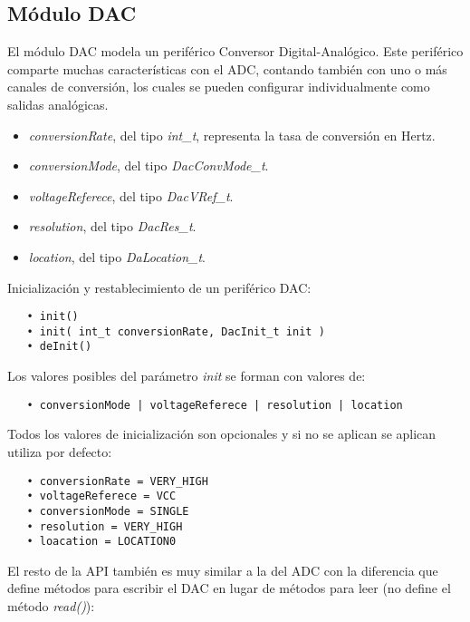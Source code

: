 \subsection{Módulo DAC}

El módulo DAC modela un periférico Conversor Digital-Analógico. Este periférico comparte muchas características con el ADC, contando también con uno o más canales de conversión, los cuales se pueden configurar individualmente como salidas analógicas.


\begin{itemize}
\item
\emph{conversionRate}, del tipo \emph{int\_t}, representa la tasa de conversión en Hertz.
\item
\emph{conversionMode}, del tipo \emph{DacConvMode\_t}.
\item
\emph{voltageReferece}, del tipo \emph{DacVRef\_t}.
\item
\emph{resolution}, del tipo \emph{DacRes\_t}.
\item
\emph{location}, del tipo \emph{DaLocation\_t}.
\end{itemize}


Inicialización y restablecimiento de un periférico DAC:

\begin{verbatim}
   • init()
   • init( int_t conversionRate, DacInit_t init )
   • deInit()
\end{verbatim}

Los valores posibles del parámetro \emph{init} se forman con valores de:

\begin{verbatim}
   • conversionMode | voltageReferece | resolution | location
\end{verbatim}

Todos los valores de inicialización son opcionales y si no se aplican se aplican utiliza por defecto:

\begin{verbatim}
   • conversionRate = VERY_HIGH
   • voltageReferece = VCC
   • conversionMode = SINGLE
   • resolution = VERY_HIGH
   • loacation = LOCATION0
\end{verbatim}

El resto de la API también es muy similar a la del ADC con la diferencia que define métodos para escribir el DAC en lugar de métodos para leer (no define el método \emph{read()}):


